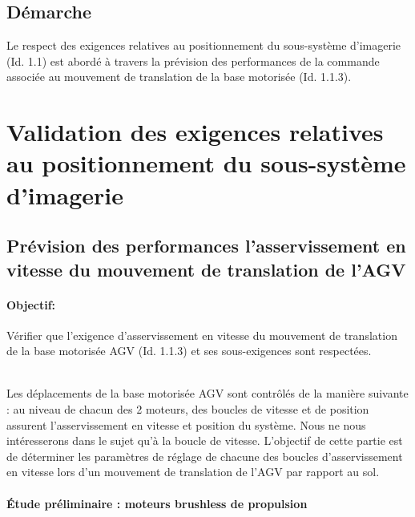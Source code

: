 \subsection{Démarche}

Le respect des exigences relatives au positionnement du sous-système d'imagerie (Id. 1.1) est abordé à travers la prévision des performances de la commande associée au mouvement de translation de la base motorisée (Id. 1.1.3).

\section{Validation des exigences relatives au positionnement du sous-système d'imagerie}

\subsection{Prévision des performances \og l'asservissement en vitesse du mouvement de translation de l'AGV \fg}

\paragraph{Objectif:} Vérifier que l'exigence d'asservissement en vitesse du mouvement de translation de la base motorisée AGV (Id. 1.1.3) et ses sous-exigences sont respectées.

~\ \\

Les déplacements de la base motorisée AGV sont contrôlés de la manière suivante : au niveau de chacun des 2 moteurs, des boucles de vitesse et de position assurent l'asservissement en vitesse et position du système. Nous ne nous intéresserons dans le sujet qu'à la boucle de vitesse. L'objectif de cette partie est de déterminer les paramètres de réglage de chacune des boucles d'asservissement en vitesse lors d'un mouvement de translation de l'AGV par rapport au sol.

\newpage

\paragraph{Étude préliminaire : moteurs brushless de propulsion}

